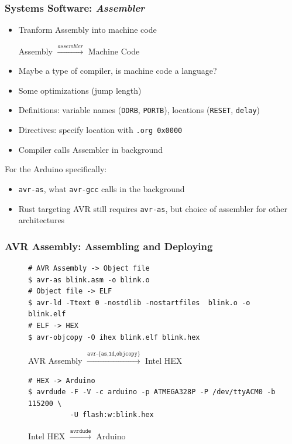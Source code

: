\documentclass{beamer} \usetheme{Madrid}
\begin{document}
\begin{frame}
    \frametitle{Systems Software: \emph{Assembler}}
    \vfill
    \begin{itemize}
        \item Tranform Assembly into machine code
            \begin{center}
                Assembly $\xrightarrow{assembler}$ Machine Code
            \end{center}
        \item Maybe a type of compiler, is machine code a language?
        \item Some optimizations (jump length)
        \item Definitions: variable names (\texttt{DDRB}, \texttt{PORTB}), locations (\texttt{RESET}, \texttt{delay})
        \item Directives: specify location with \texttt{.org 0x0000}
        \item Compiler calls Assembler in background
    \end{itemize}
    \vfill
    For the Arduino specifically:
    \begin{itemize}
        \item \texttt{avr-as}, what \texttt{avr-gcc} calls in the background
        \item Rust targeting AVR still requires \texttt{avr-as}, but choice of assembler for other architectures
    \end{itemize}
    \vfill
\end{frame}

\begin{frame}[fragile]
    \frametitle{AVR Assembly: Assembling and Deploying}
    \begin{figure}
        \begin{verbatim}
# AVR Assembly -> Object file
$ avr-as blink.asm -o blink.o
# Object file -> ELF
$ avr-ld -Ttext 0 -nostdlib -nostartfiles  blink.o -o blink.elf
# ELF -> HEX
$ avr-objcopy -O ihex blink.elf blink.hex
        \end{verbatim}
        \caption{AVR Assembly $\xrightarrow{\texttt{avr-\{as,ld,objcopy\}}}$ Intel HEX}
    \end{figure}
    \begin{figure}
        \begin{verbatim}
# HEX -> Arduino
$ avrdude -F -V -c arduino -p ATMEGA328P -P /dev/ttyACM0 -b 115200 \
          -U flash:w:blink.hex
        \end{verbatim}
        \caption{Intel HEX $\xrightarrow{\texttt{avrdude}}$ Arduino}
    \end{figure}
\end{frame}
\end{document}
